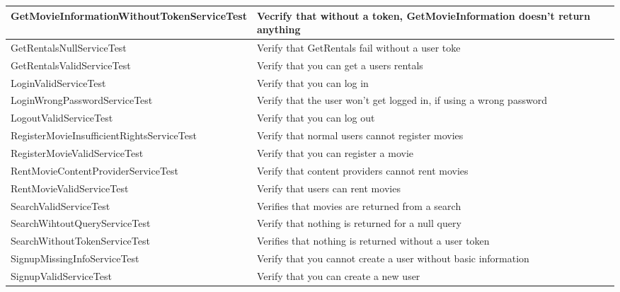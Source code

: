 \begin{centering}
\begin{longtable}{| p{5 cm} | p{7 cm} | c |}
\hline
GetMovieInformationWithoutTokenServiceTest & Vecrify that without a token, GetMovieInformation doesn't return anything & \\
\hline
GetRentalsNullServiceTest & Verify that GetRentals fail without a user toke & \\
\hline
GetRentalsValidServiceTest & Verify that you can get a users rentals & \\
\hline
LoginValidServiceTest & Verify that you can log in & \\
\hline
LoginWrongPasswordServiceTest & Verify that the user won't get logged in, if using a wrong password & \\
\hline
LogoutValidServiceTest & Verify that you can log out & \\
\hline
RegisterMovieInsufficientRightsServiceTest & Verify that normal users cannot register movies & \\
\hline
RegisterMovieValidServiceTest & Verify that you can register a movie & \\
\hline
RentMovieContentProviderServiceTest & Verify that content providers cannot rent movies & \\
\hline
RentMovieValidServiceTest & Verify that users can rent movies & \\
\hline
SearchValidServiceTest & Verifies that movies are returned from a search & \\
\hline
SearchWihtoutQueryServiceTest & Verify that nothing is returned for a null query & \\
\hline
SearchWithoutTokenServiceTest & Verifies that nothing is returned without a user token & \\
\hline
SignupMissingInfoServiceTest & Verify that you cannot create a user without basic information & \\
\hline
SignupValidServiceTest & Verify that you can create a new user & \\
\hline
\end{longtable}
\end{centering}
